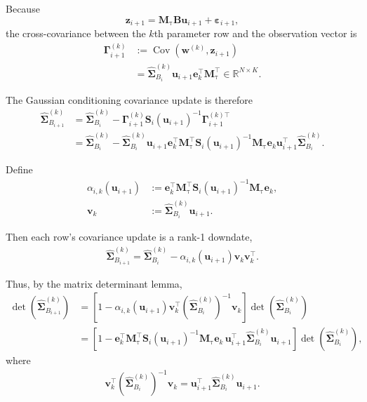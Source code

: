 \documentclass[11pt,letterpaper]{article} %
\begin{document}
Because
\[
    \bm{z}_{i+1}
    =
    \bm{M}_{\mathrm{\tau}}
    \bm{B}\bm{u}_{i+1}
    +
    \boldsymbol{\varepsilon}_{i+1},
\]
the cross-covariance between the $k$th parameter row and the
observation vector is
\begin{align*}
    \bm{\Gamma}_{i+1}^{(k)}
    &:=
    \operatorname{Cov}
    \left(
        \bm{w}^{(k)},\bm{z}_{i+1}
    \right) \\
    &=
    \hat{\bm{\Sigma}}_{B_i}^{(k)}
    \bm{u}_{i+1}
    \bm{e}_k^\top
    \bm{M}_{\mathrm{\tau}}^\top
    \in\mathbb{R}^{N\times K}.
\end{align*}

The Gaussian conditioning covariance update is therefore
\begin{align*}
    \hat{\bm{\Sigma}}_{B_{i+1}}^{(k)}
    &=
    \hat{\bm{\Sigma}}_{B_i}^{(k)}
    -
    \bm{\Gamma}_{i+1}^{(k)}
    \bm{S}_i(\bm{u}_{i+1})^{-1}
    \bm{\Gamma}_{i+1}^{(k)\top} \\
    &=
    \hat{\bm{\Sigma}}_{B_i}^{(k)}
    -
    \hat{\bm{\Sigma}}_{B_i}^{(k)}
    \bm{u}_{i+1}
    \bm{e}_k^\top
    \bm{M}_{\mathrm{\tau}}^\top
    \bm{S}_i(\bm{u}_{i+1})^{-1}
    \bm{M}_{\mathrm{\tau}}
    \bm{e}_k
    \bm{u}_{i+1}^\top
    \hat{\bm{\Sigma}}_{B_i}^{(k)}.
\end{align*}

Define
\begin{align*}
    \alpha_{i,k}(\bm{u}_{i+1})
    &:=
    \bm{e}_k^\top
    \bm{M}_{\mathrm{\tau}}^\top
    \bm{S}_i(\bm{u}_{i+1})^{-1}
    \bm{M}_{\mathrm{\tau}}
    \bm{e}_k, \\
    \bm{v}_k
    &:=
    \hat{\bm{\Sigma}}_{B_i}^{(k)}
    \bm{u}_{i+1}.
\end{align*}

Then each row's covariance update is a rank-1 downdate,
\begin{align*}
    \hat{\bm{\Sigma}}_{B_{i+1}}^{(k)}
    =
    \hat{\bm{\Sigma}}_{B_i}^{(k)}
    -
    \alpha_{i,k}(\bm{u}_{i+1})
    \bm{v}_k\bm{v}_k^\top.
\end{align*}

Thus, by the matrix determinant lemma,
\begin{align*}
    \det
    \left(
        \hat{\bm{\Sigma}}_{B_{i+1}}^{(k)}
    \right)
    &=
    \left[
        1
        -
        \alpha_{i,k}(\bm{u}_{i+1})
        \bm{v}_k^\top
        \left(
            \hat{\bm{\Sigma}}_{B_i}^{(k)}
        \right)^{-1}
        \bm{v}_k
    \right]
    \det
    \left(
        \hat{\bm{\Sigma}}_{B_i}^{(k)}
    \right) \\
    &=
    \left[
        1
        -
        \bm{e}_k^\top
        \bm{M}_{\mathrm{\tau}}^\top
        \bm{S}_i(\bm{u}_{i+1})^{-1}
        \bm{M}_{\mathrm{\tau}}
        \bm{e}_k
        \,
        \bm{u}_{i+1}^\top
        \hat{\bm{\Sigma}}_{B_i}^{(k)}
        \bm{u}_{i+1}
    \right]
    \det
    \left(
        \hat{\bm{\Sigma}}_{B_i}^{(k)}
    \right),
\end{align*}
where
\begin{align*}
    \bm{v}_k^\top
    \left(
        \hat{\bm{\Sigma}}_{B_i}^{(k)}
    \right)^{-1}
    \bm{v}_k
    =
    \bm{u}_{i+1}^\top
    \hat{\bm{\Sigma}}_{B_i}^{(k)}
    \bm{u}_{i+1}.
\end{align*}
\end{document}
